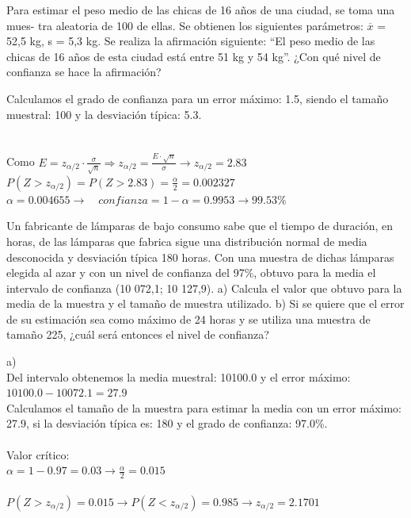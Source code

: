 \documentclass[spanish, 11pt]{exam}
\begin{document}
        \begin{questions}
        \question Para estimar el peso medio de las chicas de
16 años de una ciudad, se toma una mues-
tra aleatoria de 100 de ellas. Se obtienen
los siguientes parámetros: $\overline{x}$ = 52,5 kg,
s = 5,3 kg.
Se realiza la afirmación siguiente:
“El peso medio de las chicas de 16 años de
esta ciudad está entre 51 kg y 54 kg”.
¿Con qué nivel de confianza se hace la
afirmación? \begin{solution}   Calculamos el grado de confianza para un error máximo: 1.5, siendo el tamaño muestral: 100 y la desviación típica: 5.3. \\ \\  \\ Como $E=z_{\alpha / 2}\cdot \frac{\sigma}{\sqrt{n}} \Rightarrow z_{\alpha / 2} =\frac{E \cdot \sqrt{n}}{\sigma}\to z_{\alpha / 2}=2.83$ \\ $P(Z>z_{\alpha / 2})=P(Z>2.83)=\frac{\alpha}{2}=0.002327$ \\ $\alpha=0.004655 \to \quad confianza=1 - \alpha=0.9953 \to 99.53 \%$    \end{solution}\question Un fabricante de lámparas de bajo consumo sabe que el tiempo de duración, en horas, de las
lámparas que fabrica sigue una distribución normal de media desconocida y desviación típica 180
horas. Con una muestra de dichas lámparas elegida al azar y con un nivel de confianza del 97\%,
obtuvo para la media el intervalo de confianza (10 072,1; 10 127,9).
a) Calcula el valor que obtuvo para la media de la muestra y el tamaño de muestra utilizado.
b) Si se quiere que el error de su estimación sea como máximo de 24 horas y se utiliza una muestra de
tamaño 225, ¿cuál será entonces el nivel de confianza? \begin{solution}   a) \\ Del intervalo obtenemos la media muestral: 10100.0 y el error máximo: $10100.0-10072.1=27.9$ \\ Calculamos el tamaño de la muestra para estimar la media con un error máximo: 27.9, si la desviación típica es: 180 y el grado de confianza: 97.0\%. \\ \\ Valor crítico: \\ $\alpha=1-0.97=0.03\to \frac{\alpha}{2}=0.015$ \\ \\ $P(Z>z_{\alpha/2})=0.015\to P(Z<z_{\alpha/2})=0.985 \to z_{\alpha/2} =2.1701$ \\ 
    \begin{tikzpicture}[scale=0.8]

\end{tikzpicture}
\end{solution}
\end{questions}
\end{document}
